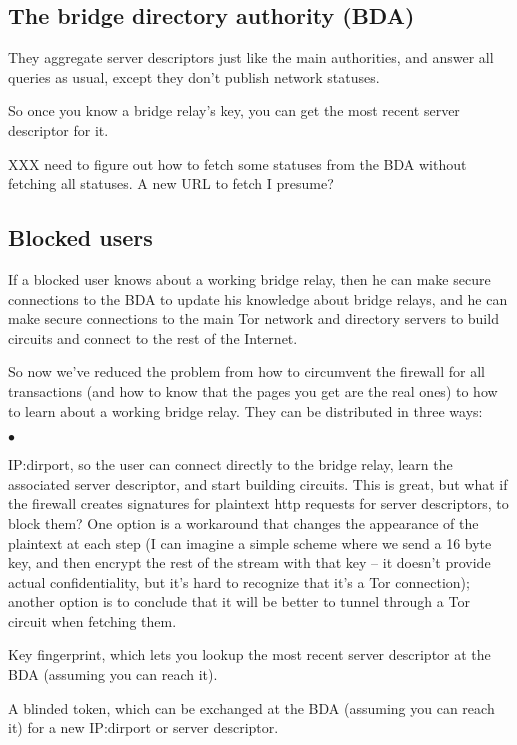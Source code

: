 \documentclass{llncs}
\newenvironment{tightlist}{\begin{list}{$\bullet$}{
  \setlength{\itemsep}{0mm}
    \setlength{\parsep}{0mm}
    }}{\end{list}}
\begin{document}
\subsection{The bridge directory authority (BDA)}

They aggregate server descriptors just like the main authorities, and
answer all queries as usual, except they don't publish network statuses.

So once you know a bridge relay's key, you can get the most recent
server descriptor for it.

XXX need to figure out how to fetch some statuses from the BDA without
fetching all statuses. A new URL to fetch I presume?

\subsection{Blocked users}

If a blocked user knows about a working bridge relay, then he can make
secure connections to the BDA to update his knowledge about bridge
relays, and he can make secure connections to the main Tor network
and directory servers to build circuits and connect to the rest of
the Internet.

So now we've reduced the problem from how to circumvent the firewall
for all transactions (and how to know that the pages you get are the
real ones) to how to learn about a working bridge relay. They can
be distributed in three ways:
\begin{tightlist}
\item IP:dirport, so the user can connect directly to the bridge
relay, learn the associated
server descriptor, and start building circuits. This is great, but what if
the firewall creates signatures for plaintext http requests for server
descriptors, to block them? One option is a workaround that changes the
appearance of the plaintext at each step (I can imagine a simple scheme
where we send a 16 byte key, and then encrypt the rest of the stream with
that key -- it doesn't provide actual confidentiality, but it's hard to
recognize that it's a Tor connection); another option is to conclude that
it will be better to tunnel through a Tor circuit when fetching them.
\item Key fingerprint, which lets you lookup the most recent server
descriptor at the BDA (assuming you can reach it).
\item A blinded token, which can be exchanged at the BDA (assuming you
can reach it) for a new IP:dirport or server descriptor.
\end{tightlist}
\end{document}
